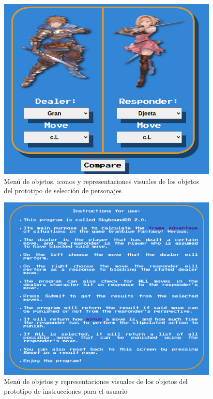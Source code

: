 \begin{center}
    \begin{figure}[ht!]
        \centering
        \includegraphics[height=0.4\textheight]{figures/Character_select_menu-object.png}
        \caption{Menú de objetos, iconos y representaciones visuales de los objetos del prototipo de selección de personajes}
        \label{fig: char sel prt}
    \end{figure}
    
    \begin{figure}
        \centering
        \includegraphics[height=0.4\textheight]{figures/Instructions_menu-object.png}
        \caption{Menú de objetos y representaciones visuales de los objetos del prototipo de instrucciones para el usuario}
        \label{fig: ins prt}
    \end{figure}
    

\end{center}
